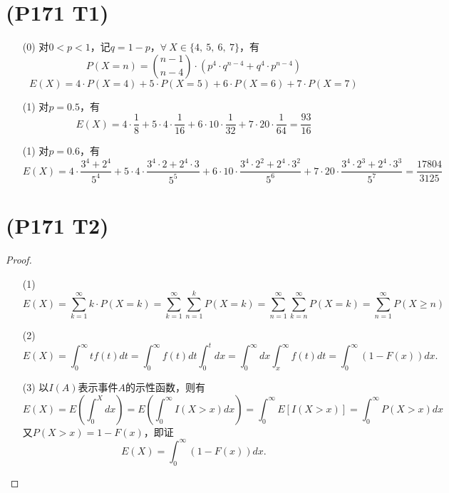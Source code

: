 \documentclass{article}
\begin{document}
\section{(P171 T1)}  %
\begin{enumerate}
    \item [(0)]对$0<p<1$，记$q=1-p$，$\forall\ X\in \{4,\ 5,\ 6,\ 7 \}$，有
    \[
        P(X=n) = \binom{n-1}{n-4} \cdot (p^4 \cdot q^{n-4} + q^4 \cdot p^{n-4})   
    \]
    \[
        E(X) = 4\cdot P(X=4) + 5 \cdot P(X=5) + 6\cdot P(X=6) + 7\cdot P(X=7)
    \]
    \item [(1)]对$p=0.5$，有
    \[
        E(X) = 4 \cdot \frac{1}{8} + 5 \cdot 4 \cdot \frac{1}{16} + 
        6 \cdot 10 \cdot \frac{1}{32} + 7 \cdot 20 \cdot \frac{1}{64}
        = \frac{93}{16}
    \]
    \item [(1)]对$p=0.6$，有
    \[
        E(X) 
        = 
        4 \cdot \frac{3^4 + 2^4}{5^4}
        + 5 \cdot 4 \cdot \frac{3^4\cdot 2 + 2^4 \cdot 3}{5^5}
        + 6 \cdot 10 \cdot \frac{3^4\cdot 2^2 + 2^4 \cdot 3^2}{5^6} 
        + 7 \cdot 20 \cdot \frac{3^4\cdot 2^3 + 2^4 \cdot 3^3}{5^7}
        = \frac{17804}{3125}
    \]
\end{enumerate}


\section{(P171 T2)}  %
\begin{proof}
    \begin{enumerate}
        \item []
        \item [(1)]
        \[
            E(X) 
            = \sum\limits_{k=1}^{\infty} k \cdot P(X=k)    
            = \sum\limits_{k=1}^{\infty} \sum\limits_{n=1}^{k} P(X=k)
            = \sum\limits_{n=1}^{\infty} \sum\limits_{k=n}^{\infty} P(X=k)
            = \sum\limits_{n=1}^{\infty} P(X\geq n)
        \]
        \item [(2)]
        \[
            E(X)
            = \int_{0}^{\infty} t f(t) dt 
            = \int_{0}^{\infty} f(t) dt \int_{0}^{t} dx
            = \int_{0}^{\infty} dx \int_{x}^{\infty} f(t) dt
            = \int_{0}^{\infty} (1- F(x)) dx.
         \]
        \item [(3)]以$I(A)$表示事件$A$的示性函数，则有
        \[
            E(X) 
            = E\left( \int_{0}^{X} dx \right)
            = E\left( \int_{0}^{\infty} I(X>x)dx \right)
            = \int_{0}^{\infty} E\left[ I(X>x) \right]
            = \int_{0}^{\infty} P(X>x) dx
        \]
        又$P(X>x) = 1 -F(x)$，即证
        \[
            E(X) = \int_{0}^{\infty} (1- F(x)) dx.
        \]
    \end{enumerate}
\end{proof}
\end{document}

